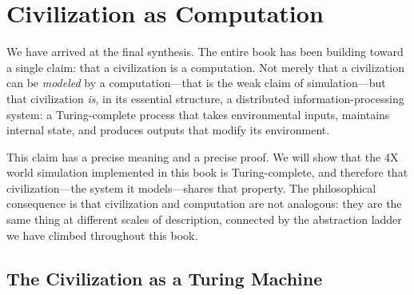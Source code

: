 \documentclass[11pt,a4paper,openany]{book}
\theoremstyle{plain}
\theoremstyle{definition}
\theoremstyle{remark}
\newenvironment{background}{%
  \begin{mdframed}[
    linecolor=sphereblue!40, backgroundcolor=sphereblue!5,
    linewidth=1pt, innertopmargin=8pt, innerbottommargin=8pt,
    innerleftmargin=10pt, innerrightmargin=10pt,
    skipabove=10pt, skipbelow=6pt
  ]%
  \setlength{\parindent}{0pt}%
  \noindent{\textcolor{sphereblue}{\textbf{Background}}}\par\smallskip\ignorespaces
}{\end{mdframed}}
\begin{document}
\chapter{Civilization as Computation}
\label{ch:civcomp}

\begin{background}
  We have arrived at the final synthesis. The entire book has been
  building toward a single claim: that a civilization is a computation.
  Not merely that a civilization can be \emph{modeled} by a
  computation---that is the weak claim of simulation---but that
  civilization \emph{is}, in its essential structure, a distributed
  information-processing system: a Turing-complete process that takes
  environmental inputs, maintains internal state, and produces outputs
  that modify its environment.

  This claim has a precise meaning and a precise proof. We will show
  that the 4X world simulation implemented in this book is Turing-complete,
  and therefore that civilization---the system it models---shares that
  property. The philosophical consequence is that civilization and
  computation are not analogous: they are the same thing at different
  scales of description, connected by the abstraction ladder we have
  climbed throughout this book.
\end{background}

\section{The Civilization as a Turing Machine}
\end{document}
